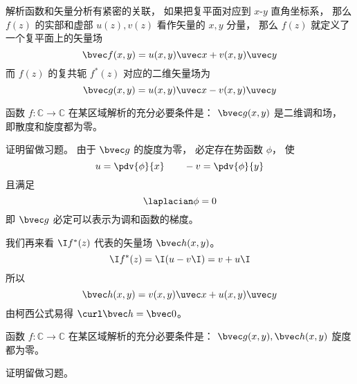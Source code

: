

解析函数和矢量分析有紧密的关联， 如果把复平面对应到 $x$-$y$ 直角坐标系， 那么 $f(z)$ 的实部和虚部 $u(z), v(z)$ 看作矢量的 $x,y$ 分量， 那么 $f(z)$ 就定义了一个复平面上的矢量场
\begin{equation}
\bvec f(x,y) = u(x,y)\uvec x + v(x,y)\uvec y
\end{equation}
而 $f(z)$ 的复共轭 $f^*(z)$ 对应的二维矢量场为
\begin{equation}
\bvec g(x,y) = u(x,y)\uvec x - v(x,y)\uvec y
\end{equation}

\begin{theorem}{}
函数 $f:\mathbb C\to\mathbb C$ 在某区域解析的充分必要条件是： $\bvec g(x,y)$ 是二维调和场， 即散度和旋度都为零。
\end{theorem}
证明留做习题。 由于 $\bvec g$ 的旋度为零， 必定存在势函数 $\phi$， 使
\begin{equation}
u = \pdv{\phi}{x} \qquad -v = \pdv{\phi}{y}
\end{equation}
且满足
\begin{equation}
\laplacian \phi = 0
\end{equation}
即 $\bvec g$ 必定可以表示为调和函数的梯度。

我们再来看 $\I f^*(z)$ 代表的矢量场 $\bvec h(x,y)$。
\begin{equation}
\I f^*(z) = \I (u - v\I) = v + u\I
\end{equation}
所以
\begin{equation}
\bvec h(x,y) = v(x,y)\uvec x + u(x,y)\uvec y
\end{equation}
由柯西公式易得 $\curl \bvec h = \bvec 0$。

\begin{theorem}{}
函数 $f:\mathbb C\to\mathbb C$ 在某区域解析的充分必要条件是： $\bvec g(x,y), \bvec h(x,y)$ 旋度都为零。
\end{theorem}
证明留做习题。
